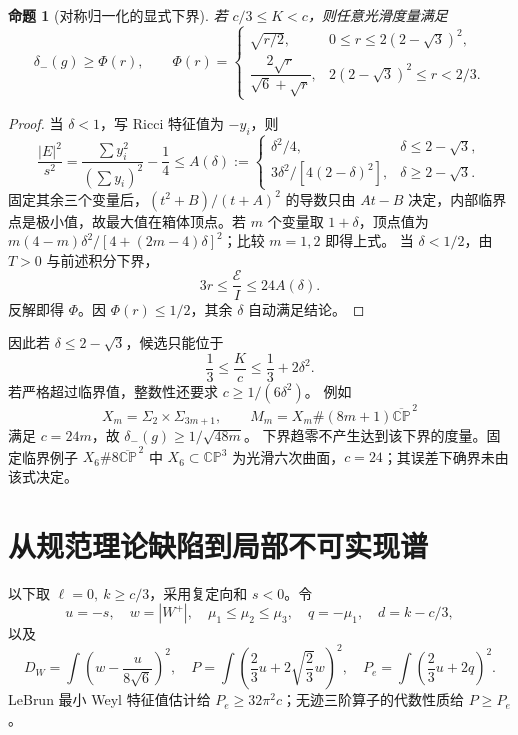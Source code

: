 \documentclass[UTF8,fontset=fandol,zihao=-4,oneside,openany]{ctexbook}
\theoremstyle{cjkplain}
\newtheorem{proposition}[theorem]{命题}
\numberwithin{equation}{chapter}
\begin{document}
\begin{proposition}[对称归一化的显式下界]\label{FND:SWgap}
若 \(c/3\le K<c\)，则任意光滑度量满足
\[
\delta_-(g)\ge\Phi(r),\qquad
\Phi(r)=
\begin{cases}
\sqrt{r/2},&0\le r\le2(2-\sqrt3)^2,\\[1mm]
\dfrac{2\sqrt r}{\sqrt6+\sqrt r},
&2(2-\sqrt3)^2\le r<2/3.
\end{cases}
\]
\end{proposition}
\begin{proof}
当 \(\delta<1\)，写 Ricci 特征值为 \(-y_i\)，则
\[
\frac{|E|^2}{s^2}=\frac{\sum y_i^2}{(\sum y_i)^2}-\frac14
\le A(\delta):=
\begin{cases}
\delta^2/4,&\delta\le2-\sqrt3,\\
3\delta^2/[4(2-\delta)^2],&\delta\ge2-\sqrt3.
\end{cases}
\]
固定其余三个变量后，\((t^2+B)/(t+A)^2\) 的导数只由 \(At-B\) 决定，内部临界点是极小值，故最大值在箱体顶点。若 \(m\) 个变量取 \(1+\delta\)，顶点值为
\(m(4-m)\delta^2/[4+(2m-4)\delta]^2\)；比较 \(m=1,2\) 即得上式。
当 \(\delta<1/2\)，由 \(T>0\) 与前述积分下界，
\[
3r\le\frac{\mathcal E}{I}\le24A(\delta).
\]
反解即得 \(\Phi\)。因 \(\Phi(r)\le1/2\)，其余 \(\delta\) 自动满足结论。
\end{proof}
因此若 \(\delta\le2-\sqrt3\)，候选只能位于
\[
\frac13\le\frac Kc\le\frac13+2\delta^2 .
\]
若严格超过临界值，整数性还要求 \(c\ge1/(6\delta^2)\)。
例如
\[
X_m=\Sigma_2\times\Sigma_{3m+1},\qquad
M_m=X_m\#(8m+1)\overline{\mathbb{CP}}^{\,2}
\]
满足 \(c=24m\)，故 \(\delta_-(g)\ge1/\sqrt{48m}\)。
下界趋零不产生达到该下界的度量。固定临界例子
\(X_6\#8\overline{\mathbb{CP}}^{\,2}\) 中 \(X_6\subset\mathbb{CP}^3\) 为光滑六次曲面，\(c=24\)；其误差下确界未由该式决定。

\section{从规范理论缺陷到局部不可实现谱}
以下取 \(\ell=0,\ k\ge c/3\)，采用复定向和 \(s<0\)。令
\[
u=-s,\quad w=|W^+|,\quad
\mu_1\le\mu_2\le\mu_3,\quad q=-\mu_1,\quad d=k-c/3,
\]
以及
\[
D_W=\int\left(w-\frac{u}{8\sqrt6}\right)^2,\quad
P=\int\left(\frac23u+2\sqrt{\frac23}w\right)^2,\quad
P_e=\int\left(\frac23u+2q\right)^2 .
\]
LeBrun 最小 Weyl 特征值估计给
\(P_e\ge32\pi^2c\)；无迹三阶算子的代数性质给 \(P\ge P_e\)。
\end{document}
